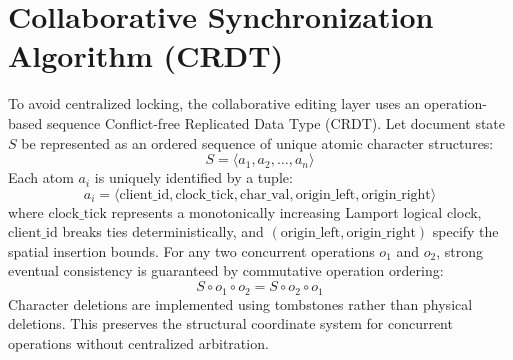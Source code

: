 \documentclass[12pt,a4paper]{report}
\begin{document}
	\section{Collaborative Synchronization Algorithm (CRDT)}
	To avoid centralized locking, the collaborative editing layer uses an operation-based sequence Conflict-free Replicated Data Type (CRDT). Let document state $S$ be represented as an ordered sequence of unique atomic character structures:
	\begin{equation}
		S = \langle a_1, a_2, \dots, a_n \rangle
	\end{equation}
	Each atom $a_i$ is uniquely identified by a tuple:
	\begin{equation}
		a_i = \langle \text{client\_id}, \text{clock\_tick}, \text{char\_val}, \text{origin\_left}, \text{origin\_right} \rangle
	\end{equation}
	where $\text{clock\_tick}$ represents a monotonically increasing Lamport logical clock, $\text{client\_id}$ breaks ties deterministically, and $(\text{origin\_left}, \text{origin\_right})$ specify the spatial insertion bounds. For any two concurrent operations $o_1$ and $o_2$, strong eventual consistency is guaranteed by commutative operation ordering:
	\begin{equation}
		S \circ o_1 \circ o_2 = S \circ o_2 \circ o_1
	\end{equation}
	Character deletions are implemented using tombstones rather than physical deletions. This preserves the structural coordinate system for concurrent operations without centralized arbitration.
	
\end{document}
